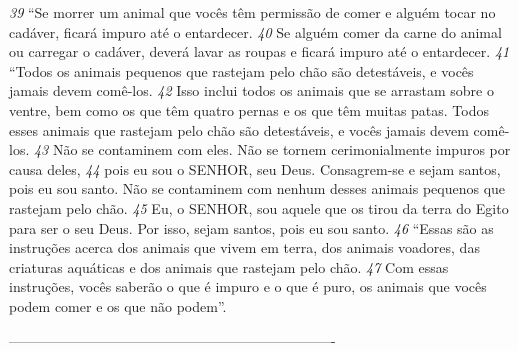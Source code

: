 \bigskip
\textit{\tiny 39}
“Se morrer um animal que vocês têm permissão de comer e alguém tocar no
cadáver, ficará impuro até o entardecer. 
\textit{\tiny 40}
Se alguém comer da carne do animal
ou carregar o cadáver, deverá lavar as roupas e ficará impuro até o entardecer.
\textit{\tiny 41}
“Todos os animais pequenos que rastejam pelo chão são detestáveis, e vocês
jamais devem comê-los. 
\textit{\tiny 42}
Isso inclui todos os animais que se arrastam sobre o
ventre, bem como os que têm quatro pernas e os que têm muitas patas. Todos
esses animais que rastejam pelo chão são detestáveis, e vocês jamais devem comê-
los. 
\textit{\tiny 43}
Não se contaminem com eles. Não se tornem cerimonialmente impuros por
causa deles, 
\textit{\tiny 44}
pois eu sou o SENHOR, seu Deus. Consagrem-se e sejam santos, pois
eu sou santo. Não se contaminem com nenhum desses animais pequenos que
rastejam pelo chão. 
\textit{\tiny 45}
Eu, o SENHOR, sou aquele que os tirou da terra do Egito para
ser o seu Deus. Por isso, sejam santos, pois eu sou santo.
\textit{\tiny 46}
“Essas são as instruções acerca dos animais que vivem em terra, dos animais
voadores, das criaturas aquáticas e dos animais que rastejam pelo chão. 
\textit{\tiny 47}
Com
essas instruções, vocês saberão o que é impuro e o que é puro, os animais que
vocês podem comer e os que não podem”.



----------------------------------------------------------------------
